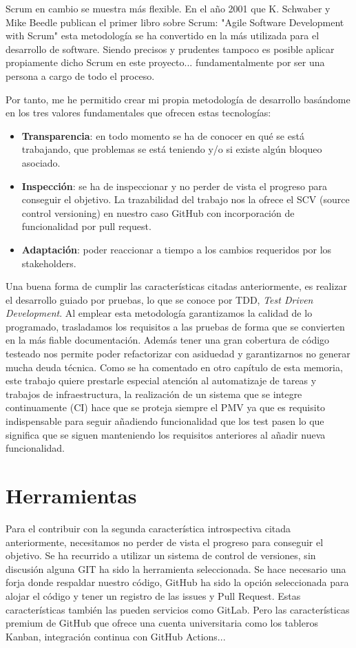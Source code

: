 Scrum en cambio se muestra más flexible. En el año 2001 que K. Schwaber y Mike Beedle publican el
primer libro sobre Scrum\cite{agile_book}: "Agile Software Development with Scrum" esta metodología se ha convertido en la
más utilizada para el desarrollo de software. Siendo precisos y prudentes tampoco es posible aplicar 
propiamente dicho Scrum en este proyecto... fundamentalmente por ser una persona a cargo de todo el proceso.

Por tanto, me he permitido crear mi propia metodología de desarrollo basándome en los tres valores fundamentales 
que ofrecen estas tecnologías:
\begin{itemize}
    \item \textbf{Transparencia}: en todo momento se ha de conocer en qué se está trabajando, que problemas se está teniendo y/o si 
    existe algún bloqueo asociado.
    \item \textbf{Inspección}: se ha de inspeccionar y no perder de vista el progreso para conseguir el objetivo. La 
    trazabilidad del trabajo nos la ofrece el SCV (source control versioning) en nuestro caso GitHub con incorporación
    de funcionalidad por pull request.
    \item \textbf{Adaptación}: poder reaccionar a tiempo a los cambios requeridos por los stakeholders.
\end{itemize}

Una buena forma de cumplir las características citadas anteriormente, es realizar el desarrollo guiado por pruebas, 
lo que se conoce por TDD, \textit{Test Driven Development}. Al emplear esta metodología garantizamos la calidad 
de lo programado, trasladamos los requisitos a las pruebas de forma que se convierten en la más fiable documentación.
Además tener una gran cobertura de código testeado nos permite poder refactorizar con asiduedad y garantizarnos 
no generar mucha deuda técnica.
Como se ha comentado en otro capítulo de esta memoria, este trabajo quiere prestarle especial atención al 
automatizaje de tareas y trabajos de infraestructura, la realización de un sistema que se integre continuamente 
(CI) hace que se proteja siempre el PMV ya que es requisito indispensable para seguir añadiendo funcionalidad 
que los test pasen lo que significa que se siguen manteniendo los requisitos anteriores al añadir nueva 
funcionalidad.

\section{Herramientas}
Para el contribuir con la segunda característica introspectiva citada anteriormente, necesitamos no perder
de vista el progreso para conseguir el objetivo. Se ha recurrido a utilizar un sistema de control de versiones,
sin discusión alguna GIT ha sido la herramienta seleccionada. Se hace necesario una forja donde respaldar nuestro 
código, GitHub ha sido la opción seleccionada para alojar el código y tener un registro de las issues y Pull Request. Estas
características también las pueden servicios como GitLab. Pero las características premium de GitHub que ofrece una cuenta
universitaria como los tableros Kanban, integración continua con GitHub Actions...


